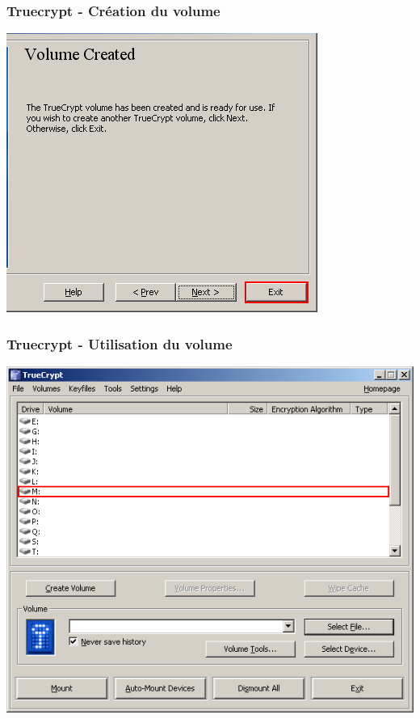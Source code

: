 \documentclass{beamer}
\begin{document}
\begin{frame}
\frametitle{Truecrypt - Création du volume}
\begin{center}
\includegraphics[scale=0.5] {./images/Truecrypt12.png} 
\end{center}
\end{frame}
\begin{frame}
\frametitle{Truecrypt - Utilisation du volume}
\begin{center}
\includegraphics[scale=0.5] {./images/Truecrypt13.png} 
\end{center}
\end{frame}
\end{document}
